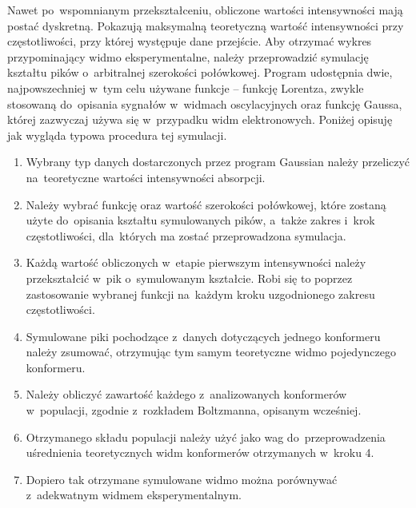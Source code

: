 Nawet po~wspomnianym przekształceniu, obliczone wartości intensywności mają postać dyskretną.
Pokazują maksymalną teoretyczną wartość intensywności przy częstotliwości, przy której
  występuje dane przejście.
Aby otrzymać wykres przypominający widmo eksperymentalne, należy przeprowadzić symulację
  kształtu pików o~arbitralnej szerokości połówkowej.
Program \tesliper{} udostępnia dwie, najpowszechniej w~tym celu używane funkcje \--- funkcję
  Lorentza, zwykle stosowaną do~opisania sygnałów w~widmach oscylacyjnych oraz funkcję
  Gaussa, której zazwyczaj używa się w~przypadku widm elektronowych.
Poniżej opisuję jak wygląda typowa procedura tej symulacji.

\begin{enumerate}
  \item Wybrany typ danych dostarczonych przez program Gaussian należy przeliczyć na~teoretyczne
  wartości intensywności absorpcji.

  \item Należy wybrać funkcję oraz wartość szerokości połówkowej, które zostaną użyte
  do~opisania kształtu symulowanych pików, a~także zakres i~krok częstotliwości, dla~których
  ma zostać przeprowadzona symulacja.

  \item Każdą wartość obliczonych w~etapie pierwszym intensywności należy przekształcić
  w~pik o~symulowanym kształcie. Robi się to poprzez zastosowanie wybranej funkcji na~każdym
  kroku uzgodnionego zakresu częstotliwości.

  \item Symulowane piki pochodzące z~danych dotyczących jednego konformeru należy zsumować,
  otrzymując tym samym teoretyczne widmo pojedynczego konformeru.

  \item Należy obliczyć zawartość każdego z~analizowanych konformerów w~populacji, zgodnie 
  z~rozkładem Boltzmanna, opisanym wcześniej.

  \item Otrzymanego składu populacji należy użyć jako wag do~przeprowadzenia uśrednienia
  teoretycznych widm konformerów otrzymanych w~kroku 4.

  \item Dopiero tak otrzymane symulowane widmo można porównywać z~adekwatnym widmem
  eksperymentalnym.
\end{enumerate}
